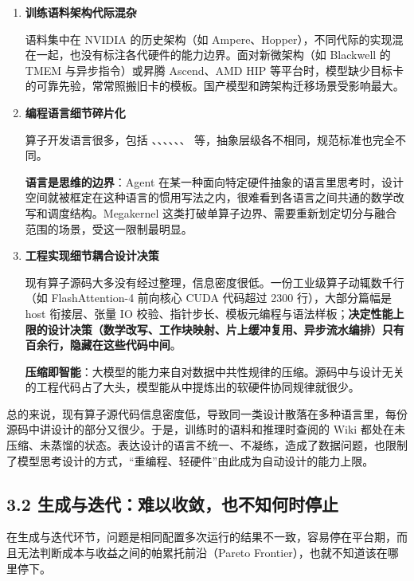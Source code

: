 \begin{enumerate}[start=1]
\item
\textbf{训练语料架构代际混杂}


语料集中在 NVIDIA 的历史架构（如 Ampere、Hopper），不同代际的实现混在一起，也没有标注各代硬件的能力边界。面对新微架构（如 Blackwell 的 TMEM 与异步指令）或昇腾 Ascend、AMD HIP 等平台时，模型缺少目标卡的可靠先验，常常照搬旧卡的模板。国产模型和跨架构迁移场景受影响最大。


\item
\textbf{编程语言细节碎片化}


算子开发语言很多，包括 、、、、、、 等，抽象层级各不相同，规范标准也完全不同。

\textbf{语言是思维的边界}：Agent 在某一种面向特定硬件抽象的语言里思考时，设计空间就被框定在这种语言的惯用写法之内，很难看到各语言之间共通的数学改写和调度结构。Megakernel 这类打破单算子边界、需要重新划定切分与融合范围的场景，受这一限制最明显。


\item
\textbf{工程实现细节耦合设计决策}


现有算子源码大多没有经过整理，信息密度很低。一份工业级算子动辄数千行（如 FlashAttention-4 前向核心 CUDA 代码超过 2300 行），大部分篇幅是 host 衔接层、张量 IO 校验、指针步长、模板元编程与语法样板；\textbf{决定性能上限的设计决策（数学改写、工作块映射、片上缓冲复用、异步流水编排）只有百余行，隐藏在这些代码中间}。

\textbf{压缩即智能}：大模型的能力来自对数据中共性规律的压缩。源码中与设计无关的工程代码占了大头，模型能从中提炼出的软硬件协同规律就很少。


\end{enumerate}

总的来说，现有算子源代码信息密度低，导致同一类设计散落在多种语言里，每份源码中讲设计的部分又很少。于是，训练时的语料和推理时查阅的 Wiki 都处在未压缩、未蒸馏的状态。表达设计的语言不统一、不凝练，造成了数据问题，也限制了模型思考设计的方式，“重编程、轻硬件”由此成为自动设计的能力上限。

\newpage

\subsection{3.2 生成与迭代：难以收敛，也不知何时停止}
在生成与迭代环节，问题是相同配置多次运行的结果不一致，容易停在平台期，而且无法判断成本与收益之间的帕累托前沿（Pareto Frontier），也就不知道该在哪里停下。


